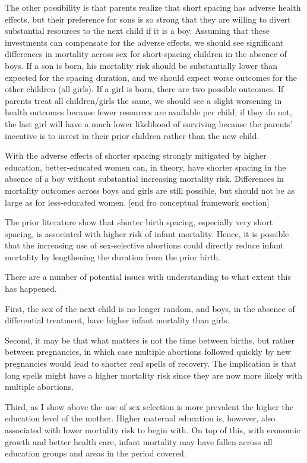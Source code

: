 \documentclass[12pt,letterpaper]{article}
\begin{document}
The other possibility is that parents realize that short spacing has adverse 
health effects, but their preference for sons is so strong that they are willing to 
divert substantial resources to the next child if it is a boy.
Assuming that these investments can compensate for the adverse effects,
we should see significant differences in mortality across sex for short-spacing 
children in the absence of boys.
If a son is born, his mortality risk should be substantially lower than expected 
for the spacing duration, and we should expect worse outcomes for the other 
children (all girls).
If a girl is born, there are two possible outcomes.
If parents treat all children/girls the same, we should see a slight worsening in 
health outcomes because fewer resources are available per child; 
if they do not, the last girl will have a much lower likelihood of surviving 
because the parents' incentive is to invest in their prior children rather than 
the new child.

With the adverse effects of shorter spacing strongly mitigated by higher education,
better-educated women can, in theory, have shorter spacing in the absence of a boy 
without substantial increasing mortality risk.
Differences in mortality outcomes across boys and girls are still possible,
but should not be as large as for less-educated women.
[end fro conceptual framework section]


The prior literature show that shorter birth spacing, especially very short spacing,
is associated with higher risk of infant mortality.
Hence, it is possible that the increasing use of sex-selective abortions could
directly reduce infant mortality by lengthening the duration from the prior birth.

There are a number of potential issues with understanding to what extent this
has happened.

First, the sex of the next child is no longer random, and boys, in the absence of
differential treatment, have higher infant mortality than girls.

Second, it may be that what matters is not the time between births, but rather 
between pregnancies, in which case multiple abortions followed quickly by new 
pregnancies would lead to shorter real spells of recovery.
The implication is that long spells might have a higher mortality risk since
they are now more likely with multiple abortions.

Third, as I show above the use of sex selection is more prevalent the higher the
education level of the mother.
Higher maternal education is, however, also associated with lower mortality risk
to begin with.
On top of this, with economic growth and better health care, infant mortality
may have fallen across all education groups and areas in the period covered.
\end{document}

